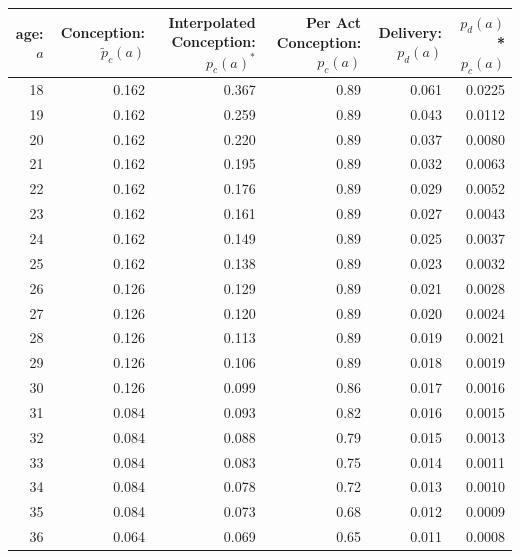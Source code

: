 \documentclass[11pt]{nih_mod}
\begin{document}
\begin{table}	
\begin{center}
  \colorbox{ECback}{
\begin{tabular}{|r|r|r|r|r|r|}
\hline
 {\bf {\footnotesize age:} $a$} &  {\bf {\footnotesize Conception:} $\tilde{p}_ c(a)$} & {\bf {\footnotesize Interpolated Conception:} $p_c(a)^*$} & {\bf {\footnotesize Per Act Conception:} $p_c(a)$} & {\bf {\footnotesize Delivery:} $p_d(a)$} & {\bf $p_d(a)$ * $p_c(a)$}\\
\hline
        18 &       0.162  &  0.367 & 0.89 &  0.061 & 0.0225\\
\hline
        19 &       0.162 &  0.259 & 0.89 & 0.043 & 0.0112\\
\hline
        20 &       0.162 & 0.220 & 0.89 & 0.037 & 0.0080\\
\hline
        21 &      0.162 & 0.195 & 0.89 & 0.032 & 0.0063\\
\hline
        22 &        0.162 & 0.176 & 0.89 & 0.029 & 0.0052\\
\hline
        23 &        0.162 & 0.161 & 0.89 & 0.027 & 0.0043\\
\hline
        24 &       0.162 & 0.149 & 0.89 & 0.025 & 0.0037\\
\hline
        25 &        0.162 & 0.138 & 0.89 & 0.023 &0.0032\\
\hline
        26 &      0.126 & 0.129 & 0.89 & 0.021 & 0.0028\\
\hline
        27 &       0.126 & 0.120 & 0.89 & 0.020& 0.0024\\
\hline
        28 &       0.126 & 0.113 & 0.89 & 0.019 & 0.0021\\
\hline
        29 &        0.126 & 0.106 & 0.89 & 0.018 & 0.0019\\
\hline
        30 &       0.126 & 0.099 & 0.86 & 0.017 & 0.0016\\
\hline
        31 &        0.084 & 0.093 & 0.82 & 0.016 & 0.0015\\
\hline
        32 &       0.084 & 0.088 & 0.79 & 0.015 & 0.0013\\
\hline
        33 &       0.084 & 0.083 & 0.75 & 0.014 & 0.0011\\
\hline
        34 &       0.084 & 0.078 & 0.72 & 0.013 & 0.0010\\
\hline
        35 &       0.084 & 0.073 & 0.68 & 0.012 & 0.0009\\
\hline
        36 &      0.064 & 0.069 & 0.65 & 0.011 & 0.0008\\

\end{tabular}}
\end{center}
\end{table}
\end{document}
